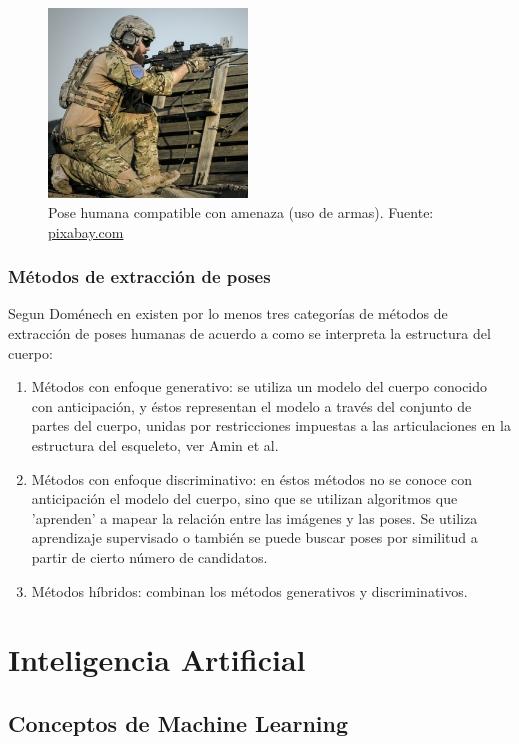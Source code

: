 \documentclass[a4paper,12pt,oneside,spanish]{book}
\begin{document}
\begin{figure}[h!]
	\includegraphics[width=150pt]{Imagenes/pose2.jpg}
	\centering
	\caption{Pose humana compatible con amenaza (uso de armas). Fuente: \url{pixabay.com}}
	\label{fig:pose3}
\end{figure}


\subsection{Métodos de extracción de poses}
Segun Doménech en \cite{human1} existen por lo menos tres categorías de métodos de extracción de poses humanas de acuerdo a como se interpreta la estructura del cuerpo:

\begin{enumerate}
	\baselineskip 16pt
	\item Métodos con enfoque generativo: se utiliza un modelo del cuerpo conocido con anticipación, y  éstos representan el modelo a través del conjunto de partes del cuerpo, unidas por restricciones
	impuestas a las articulaciones en la estructura del esqueleto, ver Amin et al.\par
	\item Métodos con enfoque discriminativo: en éstos métodos no se conoce con anticipación el modelo del cuerpo, sino que se utilizan algoritmos que 'aprenden' a mapear la relación entre las imágenes y las poses. Se utiliza aprendizaje supervisado o también se puede buscar poses por similitud a partir de cierto número de candidatos.\par
	\item Métodos híbridos: combinan los métodos generativos y discriminativos. \par
\end{enumerate}	\baselineskip 16pt

\newpage	
\chapter{Inteligencia Artificial}
\section{Conceptos de Machine Learning}
\end{document}
